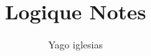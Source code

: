 \documentclass{article}
\theoremstyle{plain}
\theoremstyle{definition}
\theoremstyle{plain}
\begin{document}
\title{Logique Notes}
\author{Yago iglesias}
\maketitle
\tableofcontents



\end{document}
